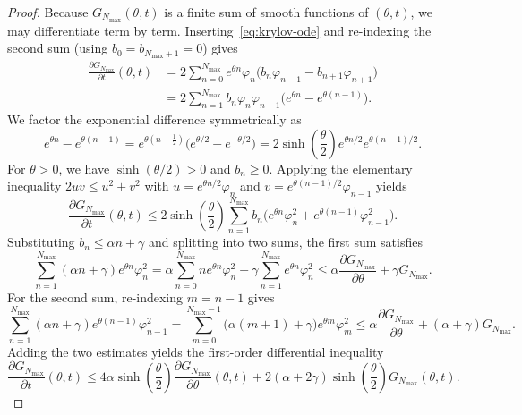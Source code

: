\documentclass[11pt,a4paper]{article}
\numberwithin{equation}{section}
\theoremstyle{plain}
\theoremstyle{definition}
\begin{document}
\begin{proof}
Because $G_{N_{\max}}(\theta,t)$ is a finite sum of smooth functions of $(\theta,t)$, we may differentiate term by term. Inserting~\eqref{eq:krylov-ode} and re-indexing the second sum (using $b_0 = b_{N_{\max}+1} = 0$) gives
\begin{align*}
  \frac{\partial G_{N_{\max}}}{\partial t}(\theta,t)
  &= 2\sum_{n=0}^{N_{\max}} e^{\theta n}\varphi_n\bigl(b_n\varphi_{n-1} - b_{n+1}\varphi_{n+1}\bigr) \\
  &= 2\sum_{n=1}^{N_{\max}} b_n \varphi_n\varphi_{n-1}\bigl(e^{\theta n} - e^{\theta(n-1)}\bigr).
\end{align*}
We factor the exponential difference symmetrically as
\[
  e^{\theta n} - e^{\theta(n-1)} = e^{\theta(n-\frac{1}{2})}\bigl(e^{\theta/2}-e^{-\theta/2}\bigr) = 2\sinh\!\left(\frac{\theta}{2}\right) e^{\theta n/2} e^{\theta(n-1)/2}.
\]
For $\theta > 0$, we have $\sinh(\theta/2) > 0$ and $b_n \ge 0$. Applying the elementary inequality $2uv \le u^2 + v^2$ with $u = e^{\theta n/2}\varphi_n$ and $v = e^{\theta(n-1)/2}\varphi_{n-1}$ yields
\[
  \frac{\partial G_{N_{\max}}}{\partial t}(\theta,t)
  \le 2\sinh\!\left(\frac{\theta}{2}\right)\sum_{n=1}^{N_{\max}} b_n\bigl(e^{\theta n}\varphi_n^2 + e^{\theta(n-1)}\varphi_{n-1}^2\bigr).
\]
Substituting $b_n \le \alpha n + \gamma$ and splitting into two sums, the first sum satisfies
\[
  \sum_{n=1}^{N_{\max}} (\alpha n + \gamma) e^{\theta n}\varphi_n^2
  = \alpha\sum_{n=0}^{N_{\max}} n e^{\theta n}\varphi_n^2 + \gamma\sum_{n=1}^{N_{\max}} e^{\theta n}\varphi_n^2
  \le \alpha\frac{\partial G_{N_{\max}}}{\partial\theta} + \gamma G_{N_{\max}}.
\]
For the second sum, re-indexing $m = n - 1$ gives
\[
  \sum_{n=1}^{N_{\max}} (\alpha n + \gamma) e^{\theta(n-1)}\varphi_{n-1}^2
  = \sum_{m=0}^{N_{\max}-1}\bigl(\alpha(m+1)+\gamma\bigr)e^{\theta m}\varphi_m^2
  \le \alpha\frac{\partial G_{N_{\max}}}{\partial\theta} + (\alpha+\gamma)G_{N_{\max}}.
\]
Adding the two estimates yields the first-order differential inequality
\begin{equation}\label{eq:pde-ineq}
  \frac{\partial G_{N_{\max}}}{\partial t}(\theta,t)
  \le 4\alpha\sinh\!\left(\frac{\theta}{2}\right)\frac{\partial G_{N_{\max}}}{\partial\theta}(\theta,t)
  + 2(\alpha+2\gamma)\sinh\!\left(\frac{\theta}{2}\right)G_{N_{\max}}(\theta,t).
\end{equation}


\end{proof}
\end{document}
